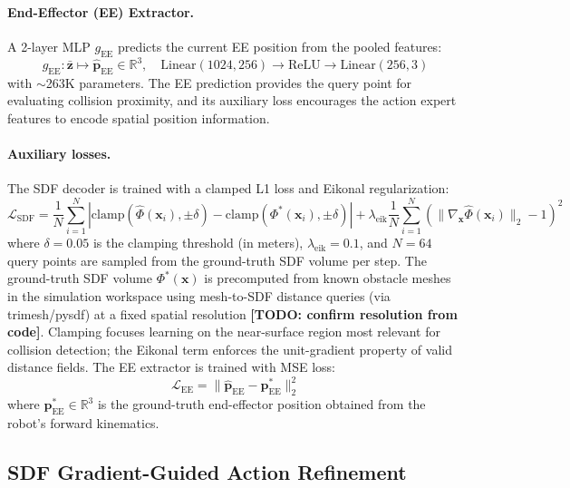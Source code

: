 \paragraph{End-Effector (EE) Extractor.} A 2-layer MLP $g_\mathrm{EE}$ predicts the current EE position from the pooled features:
\begin{equation}\label{eq:ee_extractor}
g_\mathrm{EE}: \bar{\mathbf{z}} \mapsto \hat{\mathbf{p}}_\mathrm{EE} \in \mathbb{R}^3, \quad \mathrm{Linear}(1024, 256) \to \mathrm{ReLU} \to \mathrm{Linear}(256, 3)
\end{equation}
with ${\sim}$263K parameters. The EE prediction provides the query point for evaluating collision proximity, and its auxiliary loss encourages the action expert features to encode spatial position information.

\paragraph{Auxiliary losses.} The SDF decoder is trained with a clamped L1 loss and Eikonal regularization:
\begin{equation}\label{eq:loss_sdf}
\mathcal{L}_\mathrm{SDF} = \frac{1}{N} \sum_{i=1}^{N} \left| \mathrm{clamp}(\hat{\Phi}(\mathbf{x}_i), \pm\delta) - \mathrm{clamp}(\Phi^*(\mathbf{x}_i), \pm\delta) \right| + \lambda_\mathrm{eik} \frac{1}{N} \sum_{i=1}^{N} \left( \|\nabla_{\mathbf{x}} \hat{\Phi}(\mathbf{x}_i)\|_2 - 1 \right)^2
\end{equation}
where $\delta = 0.05$ is the clamping threshold (in meters), $\lambda_\mathrm{eik} = 0.1$, and $N = 64$ query points are sampled from the ground-truth SDF volume per step. The ground-truth SDF volume $\Phi^*(\mathbf{x})$ is precomputed from known obstacle meshes in the simulation workspace using mesh-to-SDF distance queries (via trimesh/pysdf) at a fixed spatial resolution \textbf{[TODO: confirm resolution from code]}. Clamping focuses learning on the near-surface region most relevant for collision detection; the Eikonal term enforces the unit-gradient property of valid distance fields. The EE extractor is trained with MSE loss:
\begin{equation}\label{eq:loss_ee}
\mathcal{L}_\mathrm{EE} = \|\hat{\mathbf{p}}_\mathrm{EE} - \mathbf{p}^*_\mathrm{EE}\|_2^2
\end{equation}
where $\mathbf{p}^*_\mathrm{EE} \in \mathbb{R}^3$ is the ground-truth end-effector position obtained from the robot's forward kinematics.

\subsection{SDF Gradient-Guided Action Refinement}\label{sec:gradient_refinement}

